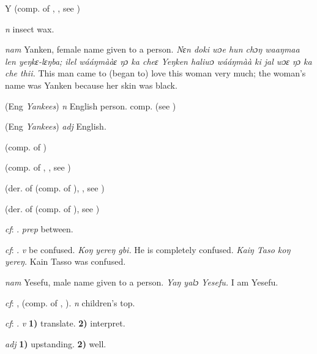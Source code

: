 \begin{letter}{Y}
 (comp. of , , see ) 

 \textit{n} insect wax.

 \textit{nam} Yanken, female name given to a person. \textit{Nɛn doki wɔe hun chɔŋ waaŋmaa len yeŋkɛ-lɛŋba; ilel wááŋmààɛ ŋɔ ka cheɛ Yeŋken haliwɔ wááŋmàà ki jal wɔɛ ŋɔ ka che thii.} This man came to (began to) love this woman very much; the woman's name was Yanken because her skin was black. 

 (Eng \textit{Yankees}) \textit{n} English person. comp.  (see ) 

 (Eng \textit{Yankees}) \textit{adj} English.

 (comp. of )

 (comp. of , , see ) 

 (der. of  (comp. of ), , see ) 

 (der. of  (comp. of ), see ) 

 \textit{cf}: . \textit{prep} between.

 \textit{cf}: . \textit{v} be confused. \textit{Koŋ yereŋ gbi.} He is completely confused. \textit{Kaiŋ Taso koŋ yereŋ.} Kain Tasso was confused.

 \textit{nam} Yesefu, male name given to a person. \textit{Yaŋ yalɔ Yesefu.} I am Yesefu.

 \textit{cf}: ,  (comp. of , ). \textit{n} children's top.

 \textit{cf}: . \textit{v} \textbf{1)} translate. \textbf{2)} interpret.

 \textit{adj} \textbf{1)} upstanding. \textbf{2)} well.


\end{letter}

